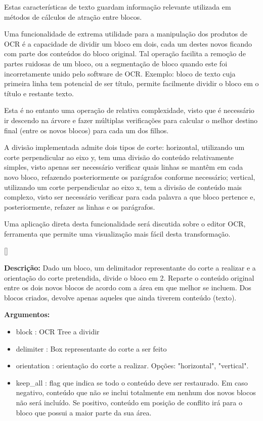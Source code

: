 Estas características de texto guardam informação relevante utilizada em métodos de cálculos de atração entre blocos.





\label{contribution_divide_blocks}

Uma funcionalidade de extrema utilidade para a manipulação dos produtos de OCR é a capacidade de dividir um bloco em dois, cada um destes novos ficando com parte dos conteúdos do bloco original. Tal operação facilita a remoção de partes ruidosas de um bloco, ou a segmentação de bloco quando este foi incorretamente unido pelo software de OCR. Exemplo: bloco de texto cuja primeira linha tem potencial de ser título, permite facilmente dividir o bloco em o título e restante texto.


Esta é no entanto uma operação de relativa complexidade, visto que é necessário ir descendo na árvore e fazer múltiplas verificações para calcular o melhor destino final (entre os novos blocos) para cada um dos filhos.

A divisão implementada admite dois tipos de corte: horizontal, utilizando um corte perpendicular ao eixo y, tem uma divisão do conteúdo relativamente simples, visto apenas ser necessário verificar quais linhas se mantêm em cada novo bloco, refazendo posteriormente os parágrafos conforme necessário; vertical, utilizando um corte perpendicular ao eixo x, tem a divisão de conteúdo mais complexo, visto ser necessário verificar para cada palavra a que bloco pertence e, posteriormente, refazer as linhas e os parágrafos. 

Uma aplicação direta desta funcionalidade será discutida sobre o editor OCR, ferramenta que permite uma visualização mais fácil desta transformação.


[\normalsize]

\textbf{Descrição:} Dado um bloco, um delimitador representante do corte a realizar e a orientação do corte pretendida, divide o bloco em 2. Reparte o conteúdo original entre os dois novos blocos de acordo com a área em que melhor se incluem. Dos blocos criados, devolve apenas aqueles que ainda tiverem conteúdo (texto).

\textbf{Argumentos:}
\begin{itemize}\setlength\itemsep{-0.3em}
	\item block : OCR Tree a dividir
	\item delimiter : Box representante do corte a ser feito
	\item orientation : orientação do corte a realizar. Opções: "horizontal", "vertical".
	\item keep\_all : flag que indica se todo o conteúdo deve ser restaurado. Em caso negativo, conteúdo que não se inclui totalmente em nenhum dos novos blocos não será incluído. Se positivo, conteúdo em posição de conflito irá para o bloco que possui a maior parte da sua área.
\end{itemize}

